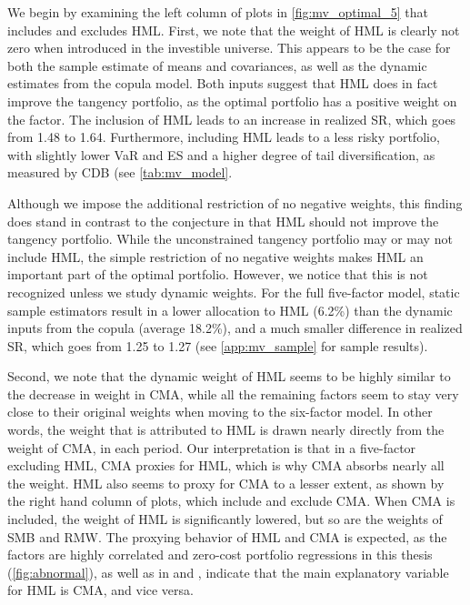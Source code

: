 We begin by examining the left column of plots in \autoref{fig:mv_optimal_5} that includes and excludes HML. First, we note that the weight of HML is clearly not zero when introduced in the investible universe. This appears to be the case for both the sample estimate of means and covariances, as well as the dynamic estimates from the copula model. Both inputs suggest that HML does in fact improve the tangency portfolio, as the optimal portfolio has a positive weight on the factor. The inclusion of HML leads to an increase in realized SR, which goes from 1.48 to 1.64. Furthermore, including HML leads to a less risky portfolio, with slightly lower VaR and ES and a higher degree of tail diversification, as measured by CDB (see \autoref{tab:mv_model}.

Although we impose the additional restriction of no negative weights, this finding does stand in contrast to the conjecture in \textcite{FF2015} that HML should not improve the tangency portfolio. While the unconstrained tangency portfolio may or may not include HML, the simple restriction of no negative weights makes HML an important part of the optimal portfolio. However, we notice that this is not recognized unless we study dynamic weights. For the full five-factor model, static sample estimators result in a lower allocation to HML (6.2\%) than the dynamic inputs from the copula (average 18.2\%), and a much smaller difference in realized SR, which goes from 1.25 to 1.27 (see \autoref{app:mv_sample} for sample results).

Second, we note that the dynamic weight of HML seems to be highly similar to the decrease in weight in CMA, while all the remaining factors seem to stay very close to their original weights when moving to the six-factor model. In other words, the weight that is attributed to HML is drawn nearly directly from the weight of CMA, in each period. Our interpretation is that in a five-factor excluding HML, CMA proxies for HML, which is why CMA absorbs nearly all the weight. HML also seems to proxy for CMA to a lesser extent, as shown by the right hand column of plots, which include and exclude CMA. When CMA is included, the weight of HML is significantly lowered, but so are the weights of SMB and RMW. The proxying behavior of HML and CMA is expected, as the factors are highly correlated and zero-cost portfolio regressions in this thesis (\autoref{fig:abnormal}), as well as in \textcite{FF2015} and \textcite{Asness2015}, indicate that the main explanatory variable for HML is CMA, and vice versa.

